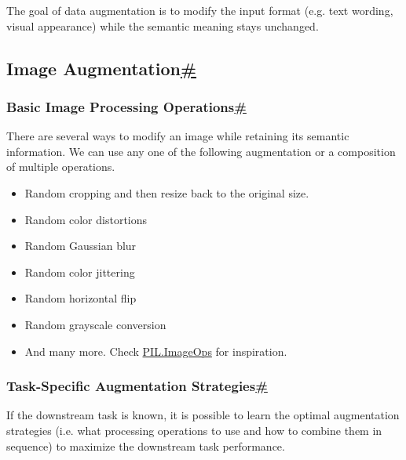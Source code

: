 The goal of data augmentation is to modify the input format (e.g. text wording, visual appearance) while the semantic meaning stays unchanged.

\subsection{\texorpdfstring{Image Augmentation\hyperref[image-augmentation]{\#}}{Image Augmentation\#}}\label{image-augmentation}

\subsubsection{\texorpdfstring{Basic Image Processing Operations\hyperref[basic-image-processing-operations]{\#}}{Basic Image Processing Operations\#}}\label{basic-image-processing-operations}

There are several ways to modify an image while retaining its semantic information. We can use any one of the following augmentation or a composition of multiple operations.

\begin{itemize}
\tightlist
\item
  Random cropping and then resize back to the original size.
\item
  Random color distortions
\item
  Random Gaussian blur
\item
  Random color jittering
\item
  Random horizontal flip
\item
  Random grayscale conversion
\item
  And many more. Check \href{https://pillow.readthedocs.io/en/stable/reference/ImageOps.html}{PIL.ImageOps} for inspiration.
\end{itemize}

\subsubsection{\texorpdfstring{Task-Specific Augmentation Strategies\hyperref[task-specific-augmentation-strategies]{\#}}{Task-Specific Augmentation Strategies\#}}\label{task-specific-augmentation-strategies}

If the downstream task is known, it is possible to learn the optimal augmentation strategies (i.e. what processing operations to use and how to combine them in sequence) to maximize the downstream task performance.

